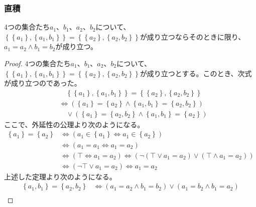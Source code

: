 \documentclass[a4paper]{jsarticle}
\begin{document}
\subsubsection{直積}%
\begin{thm}
\label{1.2.1.15}
4つの集合たち$a_{1}$、$b_{1}$、$a_{2}$、$b_{2}$について、$\left\{ \left\{ a_{1} \right\},\left\{ a_{1},b_{1} \right\} \right\} = \left\{ \left\{ a_{2} \right\},\left\{ a_{2},b_{2} \right\} \right\}$が成り立つならそのときに限り、$a_{1} = a_{2} \land b_{1} = b_{2}$が成り立つ。
\end{thm}
\begin{proof}
4つの集合たち$a_{1}$、$b_{1}$、$a_{2}$、$b_{2}$について、$\left\{ \left\{ a_{1} \right\},\left\{ a_{1},b_{1} \right\} \right\} = \left\{ \left\{ a_{2} \right\},\left\{ a_{2},b_{2} \right\} \right\}$が成り立つとする。このとき、次式が成り立つのであった。
\begin{align*}
&\quad \left\{ \left\{ a_{1} \right\},\left\{ a_{1},b_{1} \right\} \right\} = \left\{ \left\{ a_{2} \right\},\left\{ a_{2},b_{2} \right\} \right\}\\
&\Leftrightarrow \left( \left\{ a_{1} \right\} = \left\{ a_{2} \right\} \land \left\{ a_{1},b_{1} \right\} = \left\{ a_{2},b_{2} \right\} \right) \\ 
&\quad \vee \left( \left\{ a_{1} \right\} = \left\{ a_{2},b_{2} \right\} \land \left\{ a_{1},b_{1} \right\} = \left\{ a_{2} \right\} \right)
\end{align*}
ここで、外延性の公理より次のようになる。
\begin{align*}
\left\{ a_{1} \right\} = \left\{ a_{2} \right\} &\Leftrightarrow \left( a_{1} \in \left\{ a_{1} \right\} \Leftrightarrow a_{1} \in \left\{ a_{2} \right\} \right)\\
&\Leftrightarrow \left( a_{1} = a_{1} \Leftrightarrow a_{1} = a_{2} \right)\\
&\Leftrightarrow \left( \top \Leftrightarrow a_{1} = a_{2} \right) \Leftrightarrow \left( \neg\left( \top \vee a_{1} = a_{2} \right) \vee \left( \top \land a_{1} = a_{2} \right) \right)\\
&\Leftrightarrow \left( \neg\top \vee a_{1} = a_{2} \right) \Leftrightarrow a_{1} = a_{2}
\end{align*}
上述した定理より次のようになる。
\begin{align*}
\left\{ a_{1},b_{1} \right\} = \left\{ a_{2},b_{2} \right\} &\Leftrightarrow \left( a_{1} = a_{2} \land b_{1} = b_{2} \right) \vee \left( a_{1} = b_{2} \land b_{1} = a_{2} \right)\\

\end{align*}
\end{proof}
\end{document}
